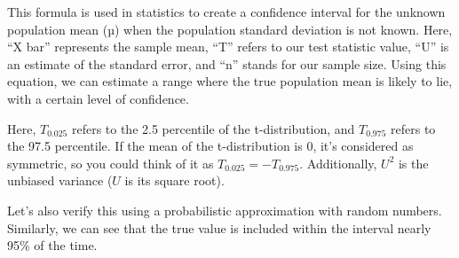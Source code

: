 \documentclass[
  a4paper,
]{book}
\begin{document}
This formula is used in statistics to create a confidence interval for
the unknown population mean (µ) when the population standard deviation
is not known. Here, ``X bar'' represents the sample mean, ``T'' refers
to our test statistic value, ``U'' is an estimate of the standard error,
and ``n'' stands for our sample size. Using this equation, we can
estimate a range where the true population mean is likely to lie, with a
certain level of confidence.

Here, \(T_{0.025}\) refers to the 2.5 percentile of the t-distribution,
and \(T_{0.975}\) refers to the 97.5 percentile. If the mean of the
t-distribution is 0, it's considered as symmetric, so you could think of
it as \(T_{0.025}=-T_{0.975}\). Additionally, \(U^2\) is the unbiased
variance (\(U\) is its square root).

Let's also verify this using a probabilistic approximation with random
numbers. Similarly, we can see that the true value is included within
the interval nearly 95\% of the time.
\end{document}
